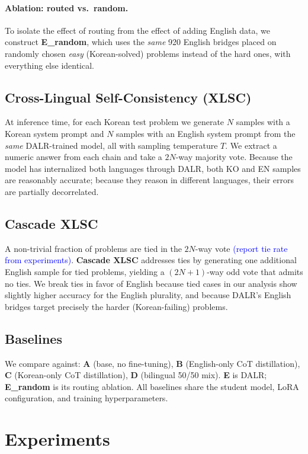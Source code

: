 \documentclass{article}
\newcommand{\note}[1]{\textcolor{blue}{{#1}}}
\begin{document}
\paragraph{Ablation: routed vs.\ random.}
To isolate the effect of routing from the effect of adding English
data, we construct \textbf{E\_random}, which uses the \emph{same} 920
English bridges placed on randomly chosen \emph{easy} (Korean-solved)
problems instead of the hard ones, with everything else identical.

\subsection{Cross-Lingual Self-Consistency (XLSC)}
\label{sec:xlsc}
At inference time, for each Korean test problem we generate $N$ samples
with a Korean system prompt and $N$ samples with an English system
prompt from the \emph{same} DALR-trained model, all with sampling
temperature $T$. We extract a numeric answer from each chain and take a
$2N$-way majority vote. Because the model has internalized both
languages through DALR, both KO and EN samples are reasonably
accurate; because they reason in different languages, their errors are
partially decorrelated.

\subsection{Cascade XLSC}
\label{sec:cascade}
A non-trivial fraction of problems are tied in the $2N$-way vote
\note{(report tie rate from experiments)}. \textbf{Cascade XLSC}
addresses ties by generating one additional English sample for tied
problems, yielding a $(2N{+}1)$-way odd vote that admits no ties. We
break ties in favor of English because tied cases in our analysis show
slightly higher accuracy for the English plurality, and because DALR's
English bridges target precisely the harder (Korean-failing) problems.

\subsection{Baselines}
We compare against: \textbf{A} (base, no fine-tuning), \textbf{B}
(English-only CoT distillation), \textbf{C} (Korean-only CoT
distillation), \textbf{D} (bilingual 50/50 mix). \textbf{E} is DALR;
\textbf{E\_random} is its routing ablation. All baselines share the
student model, LoRA configuration, and training hyperparameters.

\section{Experiments}
\end{document}
